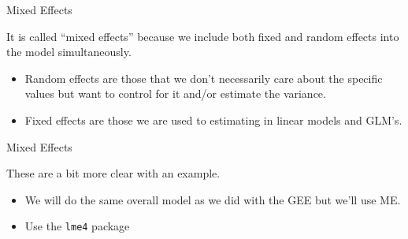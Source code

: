 \begin{frame}{Mixed Effects}

It is called ``mixed effects'' because we include both fixed and random
effects into the model simultaneously.

\begin{itemize}
\tightlist
\item
  Random effects are those that we don't necessarily care about the
  specific values but want to control for it and/or estimate the
  variance.
\item
  Fixed effects are those we are used to estimating in linear models and
  GLM's.
\end{itemize}

\end{frame}

\begin{frame}[fragile]{Mixed Effects}

These are a bit more clear with an example.

\begin{itemize}
\tightlist
\item
  We will do the same overall model as we did with the GEE but we'll use
  ME.
\item
  Use the \texttt{lme4} package
\end{itemize}

\footnotesize

\begin{Shaded}
\begin{Highlighting}[]
\StringTok{ }\OperatorTok{~}\StringTok{ }\OperatorTok{+}\StringTok{ }\OperatorTok{+}\StringTok{ }\OperatorTok{+}\StringTok{ }\OperatorTok{+}\StringTok{ }\NormalTok{(} \OperatorTok{|}\StringTok{ }
                \NormalTok{)}
\end{Highlighting}
\end{Shaded}

\end{frame}

